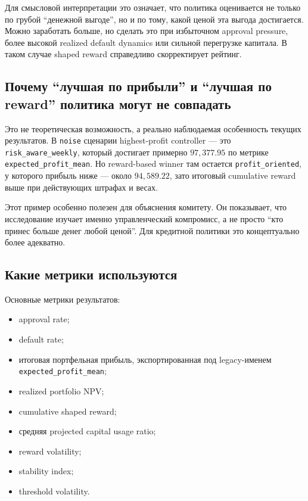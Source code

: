 \documentclass[12pt,a4paper]{article}
\begin{document}
Для смысловой интерпретации это означает, что политика оценивается не только по грубой ``денежной выгоде'', но и по тому, какой ценой эта выгода достигается. Можно заработать больше, но сделать это при избыточном approval pressure, более высокой realized default dynamics или сильной перегрузке капитала. В таком случае shaped reward справедливо скорректирует рейтинг.

\subsection{Почему ``лучшая по прибыли'' и ``лучшая по reward'' политика могут не совпадать}

Это не теоретическая возможность, а реально наблюдаемая особенность текущих результатов. В \texttt{noise} сценарии highest-profit controller --- это \texttt{risk\_aware\_weekly}, который достигает примерно $97{,}377.95$ по метрике \texttt{expected\_profit\_mean}. Но reward-based winner там остается \texttt{profit\_oriented}, у которого прибыль ниже --- около $94{,}589.22$, зато итоговый cumulative reward выше при действующих штрафах и весах.

Этот пример особенно полезен для объяснения комитету. Он показывает, что исследование изучает именно управленческий компромисс, а не просто ``кто принес больше денег любой ценой''. Для кредитной политики это концептуально более адекватно.

\subsection{Какие метрики используются}

Основные метрики результатов:
\begin{itemize}[leftmargin=*]
    \item approval rate;
    \item default rate;
    \item итоговая портфельная прибыль, экспортированная под legacy-именем \texttt{expected\_profit\_mean};
    \item realized portfolio NPV;
    \item cumulative shaped reward;
    \item средняя projected capital usage ratio;
    \item reward volatility;
    \item stability index;
    \item threshold volatility.
\end{itemize}
\end{document}
